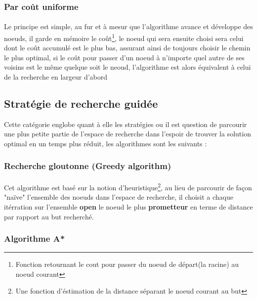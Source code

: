 \newpage
\subsubsection{Par coût uniforme}\label{DijkstraDef}
\paragraph{}
Le principe est simple, au fur et à mesur que l'algorithme avance et développe des noeuds, il garde en mémoire le coût\footnote[1]{Fonction retournant le cout pour passer du noeud de départ(la racine) au noeud courant}, le noeud qui sera ensuite choisi sera celui dont le coût accumulé est le plus bas, assurant ainsi de toujours choisir le chemin le plus optimal, si le coût pour passer d'un noeud à n'importe quel autre de ses voisins est le même quelque soit le neoud, l'algorithme est alors équivalent à celui de la recherche en largeur d'abord

\subsection{Stratégie de recherche guidée}
Cette catégorie englobe quant à elle les stratégies ou il est question de parcourir une plus petite partie de l'espace de recherche dans l'espoir de trouver la solution optimal en un temps plus réduit, les algorithmes sont les suivants : 
\subsubsection{Recherche gloutonne (Greedy algorithm)}\label{GreedyDef}
\paragraph{}
Cet algorithme est basé sur la notion d'heuristique\footnote[1]{Une fonction d'éstimation de la distance séparant le noeud courant au but }, au lieu de parcourir de façon "naïve" l'ensemble des noeuds dans l'espace de recherche, il choisit a chaque itérration sur l'ensemble \textbf{open} le noeud le plus \textbf{prometteur} en terme de distance par rapport au but recherché.

\subsubsection{Algorithme A*}\label{AstarDef}
